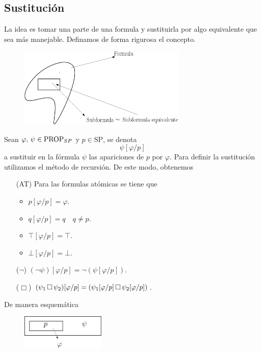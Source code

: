 \subsection{Sustitución}
La idea es tomar una parte de una formula y sustituirla por algo equivalente que sea más manejable. Definamos de forma rigurosa el concepto. 

\begin{figure}[h]
\centering
\includegraphics[width=8cm]{susti}
\end{figure}

\begin{definition} Sean $\varphi, \, \psi \in \mbox{PROP}_{SP}$ y $p \in \mbox{SP}$, se denota
\[ \psi[\varphi/p] \]
a sustituir en la fórmula $\psi$ las apariciones de $p$ por $\varphi$. Para definir la sustitución utilizamos el método de recursión. De este modo, obtenemos 
\begin{itemize}
    \item[(AT)] Para las formulas atómicas se tiene que
    \begin{itemize}
    	\item $p[\varphi/p] = \varphi$.
    	\item $q[\varphi/p] = q \quad q \neq p$.
    	\item $\top[\varphi/p] = \top$.
    	\item $\bot[\varphi/p] = \bot$.
    \end{itemize}
    \item[($\neg$)] $(\neg\psi)[\varphi/p] = \neg(\psi[\varphi/p])$.
    \item[($\Box$)] $(\psi_1 \, \Box \, \psi_2)[\varphi/p] = (\psi_1[\varphi/p] \, \Box \, \psi_2[\varphi/p])$.
\end{itemize}
\end{definition}

De manera esquemática 

\begin{figure}[h]
\centering
\includegraphics[width=4cm]{esq}
\end{figure}

